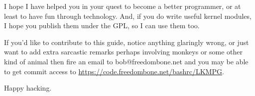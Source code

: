 \documentclass[11pt]{article}
\begin{document}
I hope I have helped you in your quest to become a better programmer, or at least to have fun through technology. And, if you do write useful kernel modules, I hope you publish them under the GPL, so I can use them too.

If you'd like to contribute to this guide, notice anything glaringly wrong, or just want to add extra sarcastic remarks perhaps involving monkeys or some other kind of animal then fire an email to bob@freedombone.net and you may be able to get commit access to \url{https://code.freedombone.net/bashrc/LKMPG}.

Happy hacking.
\end{document}
